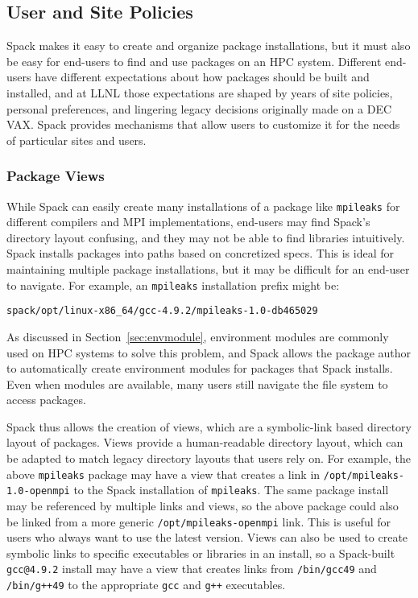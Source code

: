 
\subsection{User and Site Policies}
\label{sec:usecase-policy}

Spack makes it easy to create and organize package installations,
but it must also be easy for end-users to find and use packages on an HPC
system. Different end-users have different expectations about how packages
should be built and installed, and at LLNL those expectations are shaped
by years of site policies, personal preferences, and lingering legacy
decisions originally made on a DEC VAX.
Spack provides mechanisms that allow users to customize it for the needs
of particular sites and users.


\subsubsection{Package Views}
\label{sec:package-views}

While Spack can easily create many installations of a package like {\tt mpileaks}
for different compilers and MPI implementations, end-users may find Spack's directory layout confusing, and they may not be able to find libraries intuitively.
Spack installs packages into paths based on concretized specs.
This is ideal for maintaining multiple package installations,
but it may be difficult for an end-user to navigate.
For example, an {\tt mpileaks} installation prefix might be:
%
\begin{verbatim}
spack/opt/linux-x86_64/gcc-4.9.2/mpileaks-1.0-db465029
\end{verbatim}

As discussed in Section~\ref{sec:envmodule},
environment modules are commonly used on HPC systems to solve this problem,
and Spack allows the package author to automatically create environment modules
for packages that Spack installs.
Even when modules are available, many users still
navigate the file system to access packages.

Spack thus allows the creation of views, which are a symbolic-link based directory layout of packages.
Views provide a human-readable directory layout,
which can be adapted to match legacy directory layouts that users rely on.
For example, the above {\tt mpileaks} package may have a view that creates a link in
{\tt /opt/mpileaks-1.0-openmpi} to the Spack installation of {\tt mpileaks}.
The same package install may be referenced by multiple links and views,
so the above package could also be linked from a more generic {\tt /opt/mpileaks-openmpi}
link. This is useful for users who always want to use the latest version.
Views can also be used to create symbolic links to specific executables or libraries in an install,
so a Spack-built {\tt gcc@4.9.2} install may have a view that creates links from
{\tt /bin/gcc49} and {\tt /bin/g++49} to the appropriate {\tt gcc} and {\tt g++} executables.

